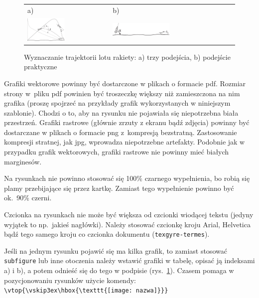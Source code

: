 \begin{figure}[htb]
  \centering
	\begin{tabular}{@{}ll@{}}
	a) & b) \\
  \includegraphics[width=0.475\textwidth]{rys05/beta1} & 
	\includegraphics[width=0.475\textwidth]{rys05/alfa1}
	\end{tabular}
  \caption{Wyznaczanie trajektorii lotu rakiety: a) trzy podejścia, b) podejście praktyczne}
  \label{fig:alfabeta}
\end{figure}

Grafiki wektorowe powinny być dostarczone w plikach o formacie pdf. Rozmiar strony w~pliku pdf powinien być troszeczkę większy niż zamieszczona na nim grafika (proszę spojrzeć na przykłady grafik wykorzystanych w niniejszym szablonie). Chodzi o to, aby na rysunku nie pojawiała się niepotrzebna biała przestrzeń. Grafiki rastrowe (głównie zrzuty z ekranu bądź zdjęcia) powinny być dostarczane w plikach o formacie png z~kompresją bezstratną. Zastosowanie kompresji stratnej, jak jpg, wprowadza niepotrzebne artefakty. Podobnie jak w przypadku grafik wektorowych, grafiki rastrowe nie powinny mieć białych marginesów.

Na rysunkach nie powinno stosować się 100\% czarnego wypełnienia, bo robią się plamy przebijające się przez kartkę. Zamiast tego wypełnienie powinno być ok.\ 90\% czerni.

Czcionka na rysunkach nie może być większa od czcionki wiodącej tekstu (jedyny wyjątek to np.\ jakieś nagłówki).
Należy stosować czcionkę kroju Arial, Helvetica bądź tego samego kroju co czcionka dokumentu (\texttt{texgyre-termes}). 

Jeśli na jednym rysunku pojawić się ma kilka grafik, to zamiast stosować \texttt{subfigure} lub inne otoczenia należy wstawić grafiki w tabelę, opisać ją indeksami a) i b), a potem odnieść się do tego w podpisie (rys.~\ref{fig:alfabeta}).
Czasem pomaga w pozycjonowaniu rysunków użycie komendy:
\verb+\vtop{\vskip3ex\hbox{\texttt{[image: nazwa]}}}+


